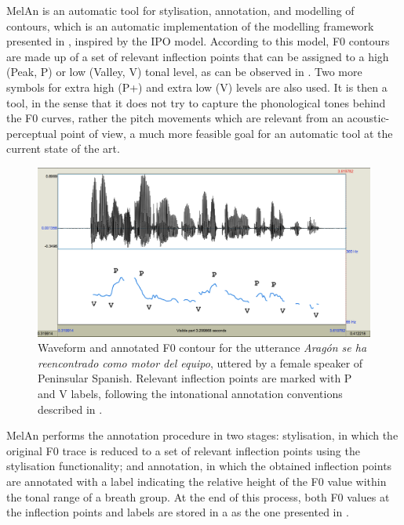\documentclass[output=paper]{langsci/langscibook}
\begin{document}
MelAn is an automatic tool for stylisation, annotation, and modelling of  contours, which is an automatic implementation of the  modelling framework presented in \citep{Garrido1996,Garrido2001}, inspired by the IPO model. According to this model, F0 contours are made up of a set of relevant inflection points that can be assigned to a high (Peak, P) or low (Valley, V) tonal level, as can be observed in . Two more symbols for extra high (P+) and extra low (V\textminus) levels are also used. It is then a  tool, in the sense that it does not try to capture the phonological tones behind the F0 curves, rather the pitch movements which are relevant from an acoustic-perceptual point of view, a much more feasible goal for an automatic tool at the current state of the art.\largerpage[-2]


\begin{figure}
\includegraphics[width=\textwidth]{figures/GAR-img003.png}
\caption{Waveform and annotated F0 contour for the utterance \textit{Aragón se ha reencontrado como motor del equipo}, uttered by a female speaker of Peninsular Spanish. Relevant inflection points are marked with P and V labels, following the intonational annotation conventions described in \citet{Garrido1996,Garrido2001}.}
\label{fig:gar:3}
\end{figure}

MelAn performs the annotation procedure in two stages: stylisation, in which the original F0 trace is reduced to a set of relevant inflection points using the  stylisation functionality; and annotation, in which the obtained inflection points are annotated with a label indicating the relative height of the F0 value within the tonal range of a breath group. At the end of this process, both F0 values at the inflection points and  labels are stored in a  as the one presented in .
\end{document}
